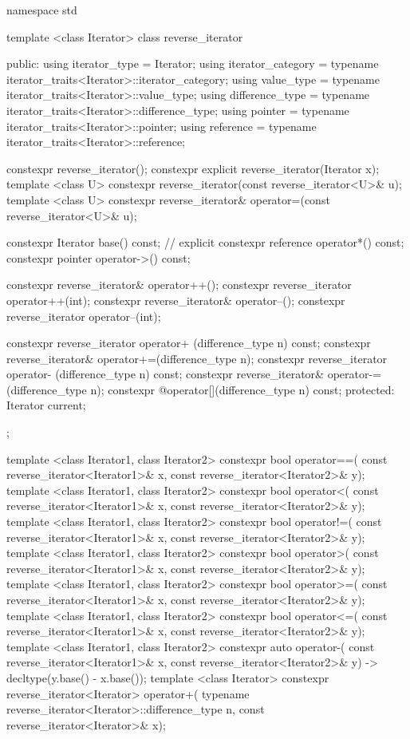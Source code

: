 %
\begin{codeblock}
namespace std {
  template <class Iterator>
  class reverse_iterator {
  public:
    using iterator_type     = Iterator;
    using iterator_category = typename iterator_traits<Iterator>::iterator_category;
    using value_type        = typename iterator_traits<Iterator>::value_type;
    using difference_type   = typename iterator_traits<Iterator>::difference_type;
    using pointer           = typename iterator_traits<Iterator>::pointer;
    using reference         = typename iterator_traits<Iterator>::reference;

    constexpr reverse_iterator();
    constexpr explicit reverse_iterator(Iterator x);
    template <class U> constexpr reverse_iterator(const reverse_iterator<U>& u);
    template <class U> constexpr reverse_iterator& operator=(const reverse_iterator<U>& u);

    constexpr Iterator base() const;      // explicit
    constexpr reference operator*() const;
    constexpr pointer   operator->() const;

    constexpr reverse_iterator& operator++();
    constexpr reverse_iterator  operator++(int);
    constexpr reverse_iterator& operator--();
    constexpr reverse_iterator  operator--(int);

    constexpr reverse_iterator  operator+ (difference_type n) const;
    constexpr reverse_iterator& operator+=(difference_type n);
    constexpr reverse_iterator  operator- (difference_type n) const;
    constexpr reverse_iterator& operator-=(difference_type n);
    constexpr @\unspecnc@ operator[](difference_type n) const;
  protected:
    Iterator current;
  };

  template <class Iterator1, class Iterator2>
    constexpr bool operator==(
      const reverse_iterator<Iterator1>& x,
      const reverse_iterator<Iterator2>& y);
  template <class Iterator1, class Iterator2>
    constexpr bool operator<(
      const reverse_iterator<Iterator1>& x,
      const reverse_iterator<Iterator2>& y);
  template <class Iterator1, class Iterator2>
    constexpr bool operator!=(
      const reverse_iterator<Iterator1>& x,
      const reverse_iterator<Iterator2>& y);
  template <class Iterator1, class Iterator2>
    constexpr bool operator>(
      const reverse_iterator<Iterator1>& x,
      const reverse_iterator<Iterator2>& y);
  template <class Iterator1, class Iterator2>
    constexpr bool operator>=(
      const reverse_iterator<Iterator1>& x,
      const reverse_iterator<Iterator2>& y);
  template <class Iterator1, class Iterator2>
    constexpr bool operator<=(
      const reverse_iterator<Iterator1>& x,
      const reverse_iterator<Iterator2>& y);
  template <class Iterator1, class Iterator2>
    constexpr auto operator-(
      const reverse_iterator<Iterator1>& x,
      const reverse_iterator<Iterator2>& y) -> decltype(y.base() - x.base());
  template <class Iterator>
    constexpr reverse_iterator<Iterator> operator+(
      typename reverse_iterator<Iterator>::difference_type n,
      const reverse_iterator<Iterator>& x);

}
\end{codeblock}
